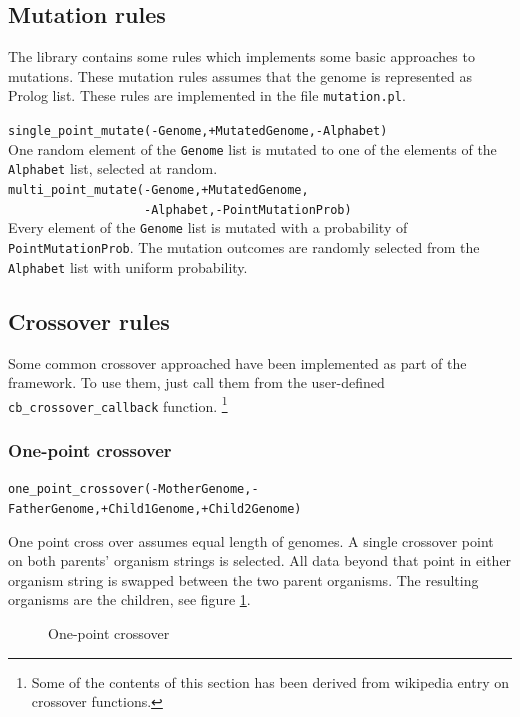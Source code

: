 \documentclass{article}
\begin{document}
\subsection{Mutation rules}
\label{sec:mutation_rules}

The library contains some rules which implements some basic approaches to mutations. These mutation rules assumes that the genome is represented as Prolog list. These rules are implemented in the file 
\verb|mutation.pl|.

\bigskip
\noindent
\verb|single_point_mutate(-Genome,+MutatedGenome,-Alphabet)|\\
One random element of the \verb|Genome| list is mutated to one of the elements of the \verb|Alphabet| list, selected at random.\\

\bigskip
\noindent
\verb|multi_point_mutate(-Genome,+MutatedGenome,|\\
\verb|                   -Alphabet,-PointMutationProb)| \\
Every element of the  \verb|Genome| list is mutated with a probability of \texttt{PointMutationProb}. 
The mutation outcomes are randomly selected from the \verb|Alphabet| list with uniform probability.

\subsection{Crossover rules}
\label{sec:crossover_rules}


Some common crossover approached have been implemented as part of the framework. To use them, just call them from the user-defined \verb|cb_crossover_callback| function. 
\footnote{Some of the contents of this section has been derived from wikipedia entry on crossover functions.}

\subsubsection{One-point crossover}

\verb|one_point_crossover(-MotherGenome,-FatherGenome,+Child1Genome,+Child2Genome)|
\medskip

One point cross over assumes equal length of genomes. A single crossover point on both parents' organism strings is selected. All data beyond that point in either organism string is swapped between the two parent organisms. The resulting organisms are the children, see figure \ref{fig:one_point_crossover}.
\begin{figure}[htb]
\caption{One-point crossover}
\label{fig:one_point_crossover}
\centerline{ }
\end{figure}
\end{document}
